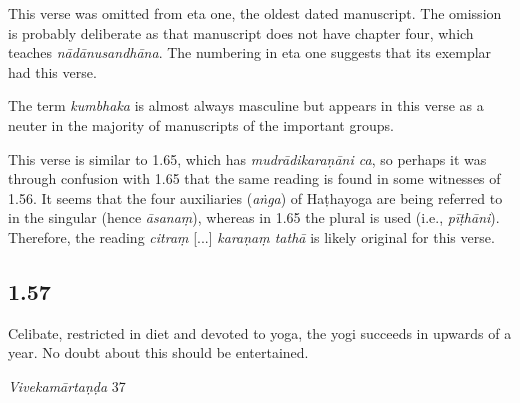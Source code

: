 \begin{ekdosis}
\begin{philcomm}[hp01_056]
This verse was omitted from eta one, the oldest dated manuscript. The omission is probably deliberate as that manuscript does not have chapter four, which teaches \emph{nādānusandhāna}. The numbering in eta one suggests that its exemplar had this verse.

The term \emph{kumbhaka} is almost always masculine but appears in this verse as a neuter in the majority of manuscripts of the important groups.


This verse is similar to 1.65, which has \emph{mudrādikaraṇāni ca}, so perhaps it was through confusion with 1.65 that the same reading is found in some witnesses of 1.56. It seems that the four auxiliaries (\emph{aṅga}) of Haṭhayoga are being referred to in the singular (hence \emph{āsanaṃ}), whereas in 1.65 the plural is used (i.e., \emph{pīṭhāni}). Therefore, the reading \emph{citraṃ} [...] \emph{karaṇaṃ tathā} is likely original for this verse.

%
\end{philcomm}

\subsection*{1.57}
\begin{translation}[hp01_057]
Celibate, restricted in diet and devoted to yoga, the yogi succeeds in upwards of a year. No doubt about this should be entertained.
\end{translation}

\begin{sources}[hp01_057]
\emph{Vivekamārtaṇḍa} 37

\begin{versinnote}
\end{versinnote}


\end{sources}
\end{ekdosis}

